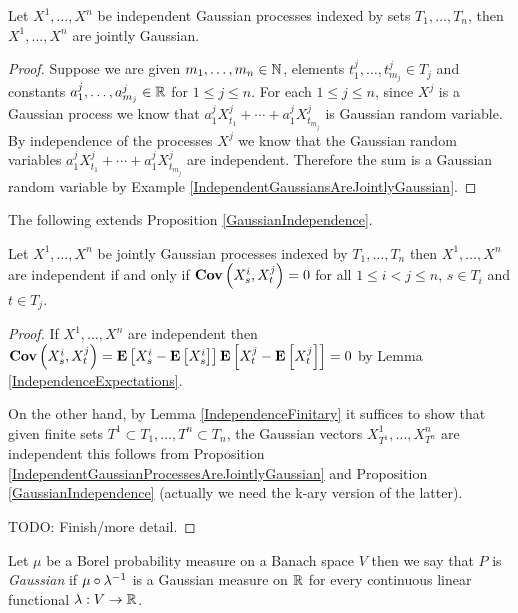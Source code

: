 \begin{prop}\label{IndependentGaussianProcessesAreJointlyGaussian}Let $X^1, \dotsc, X^n$ be independent Gaussian processes indexed by sets  $T_1, \dotsc, T_n$, then $X^1, \dotsc, X^n$ are jointly Gaussian.
\end{prop}
\begin{proof}
Suppose we are given $m_1, \dotsc, m_n \in \mathbb{N}$, elements $t^j_1, \dotsc, t^j_{m_j} \in T_j$ and constants $a^j_1, \dotsc, a^j_{m_j} \in \mathbb{R}$ for $1 \leq j \leq n$.  For each $1 \leq j \leq n$, since $X^j$ is a Gaussian process we know that $a^j_1 X^j_{t_1} + \dotsb + a^j_1 X^j_{t_{m_j}}$ is Gaussian random variable.  By independence of the processes $X^j$ we know that the Gaussian random variables $a^j_1 X^j_{t_1} + \dotsb + a^j_1 X^j_{t_{m_j}}$ are independent.  Therefore the sum 
is a Gaussian random variable by Example \ref{IndependentGaussiansAreJointlyGaussian}.
\end{proof}

The following extends Proposition \ref{GaussianIndependence}.
\begin{prop}\label{GaussianProcessIndependence}Let $X^1, \dotsc, X^n$ be jointly Gaussian processes indexed by $T_1, \dotsc, T_n$ then $X^1, \dotsc, X^n$ are independent if and only if $\textbf{Cov} \left (X^i_s, X^j_t \right ) = 0$ for all $1 \leq i < j  \leq n$, $s\in T_i$ and $t \in T_j$.
\end{prop}
\begin{proof}
If $X^1, \dotsc, X^n$ are independent then $\textbf{Cov} \left (X^i_s, X^j_t \right ) = \textbf{E}\left[X^i_s - \textbf{E}\left[X^i_s\right]\right]\textbf{E}\left[X^j_t - \textbf{E}\left[X^j_t\right]\right]=0$ by Lemma \ref{IndependenceExpectations}.

On the other hand, by Lemma \ref{IndependenceFinitary} it suffices to show that given finite sets $T^1 \subset T_1, \dotsc, T^n \subset T_n$, the Gaussian vectors $X^1_{T^1}, \dotsc, X^n_{T^n}$ are independent  this follows from Proposition \ref{IndependentGaussianProcessesAreJointlyGaussian} and Proposition \ref{GaussianIndependence} (actually we need the k-ary version of the latter).

TODO: Finish/more detail.
\end{proof}

\begin{defn}Let $\mu$ be a Borel probability measure on a Banach space $V$ then we say that $P$ is \emph{Gaussian} if $\mu \circ \lambda^{-1}$ is a Gaussian measure on $\mathbb{R}$ for every continuous linear functional $\lambda : V \to \mathbb{R}$.
\end{defn}

